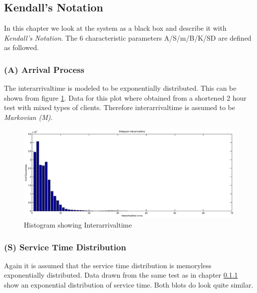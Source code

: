\documentclass[a4paper]{article}
\begin{document}



\subsection{Kendall's Notation}
In this chapter we look at the system as a black box and describe it with \textit{Kendall's Notation}. The 6 characteristic parameters A/S/m/B/K/SD are defined as followed.

\subsubsection{(A) Arrival Process}
\label{subsub:ArrivalProcess}

The interarrivaltime is modeled to be exponentially distributed. This can be shown from figure \ref{fig:interarrivaltime}. Data for this plot where obtained from a shortened 2 hour test with mixed types of clients. Therefore interarrivaltime is assumed to be \textit{Markovian (M)}.



\begin{figure}[H]
	\begin{center}
    \includegraphics[scale=0.6]{../plots-ms2-mg/interarrivaltime.eps}
  \end{center}
  \caption{Histogram showing Interarrivaltime}
  \label{fig:interarrivaltime}
\end{figure}



\subsubsection{(S) Service Time Distribution }

Again it is assumed that the service time distribution is memoryless exponentially distributed. Data drawn from the same test as in chapter \ref{subsub:ArrivalProcess} show an exponential distribution of service time. Both blots do look quite similar.
\end{document}
